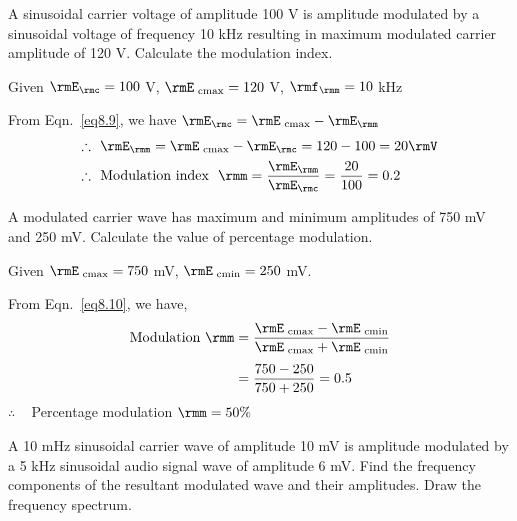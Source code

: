 \begin{problem}\label{prob8.3}
A sinusoidal carrier voltage of amplitude 100 V is amplitude modulated
by a sinusoidal voltage of frequency 10 kHz resulting in maximum
modulated carrier amplitude of 120 V. Calculate the modulation index.
\end{problem}

\begin{solution}
Given $\rmE_\rmc = 100$ V, $\rmE_{\text{ cmax}} =120$ V, $\rmf_\rmm =10$ kHz

From Eqn.~\eqref{eq8.9}, we have $\rmE_\rmc = \rmE_{\text{ cmax}} - \rmE_\rmm$
\begin{align*}
\therefore ~~& \rmE_\rmm = \rmE_{\text{ cmax}} - \rmE_\rmc = 120 - 100 = 20 \rmV \\
\therefore ~~& \text{Modulation index } ~\rmm = \frac{\rmE_\rmm}{\rmE_\rmc}
= \frac{20}{100} = 0.2
\end{align*}
\end{solution}

\begin{problem}\label{prob8.4}
A modulated carrier wave has maximum and minimum amplitudes of 750 mV
and 250 mV. Calculate the value of percentage modulation.
\end{problem}

\begin{solution}
Given $\rmE_{\text{ cmax}} = 750$ mV,  $\rmE_{\text{ cmin}} =250$ mV.

From Eqn.~\eqref{eq8.10}, we have,
\begin{align*}
\text{Modulation } \rmm & = \frac{\rmE_{\text{ cmax}} - \rmE_{\text{ cmin}}}{\rmE_{\text{
cmax}} + \rmE_{\text{ cmin}}}\\[4pt]
& = \frac{750-250}{750+250} = 0.5
\end{align*}
$\therefore$ ~ Percentage modulation $\rmm=50\%$
\end{solution}

\begin{problem}\label{prob8.5}
A 10 mHz sinusoidal carrier wave of amplitude 10 mV is amplitude
modulated by a 5 kHz sinusoidal audio signal wave of amplitude 6
mV. Find the frequency components of the resultant modulated wave and
their amplitudes. Draw the frequency spectrum.
\end{problem}


